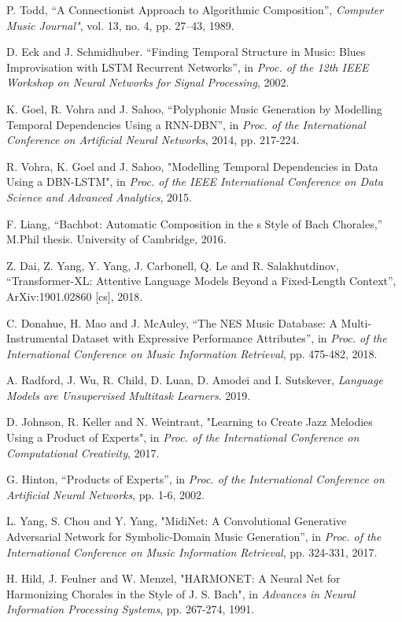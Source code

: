 \documentclass{article}
\begin{document}
\begin{thebibliography}{citations}
P. Todd, “A Connectionist Approach to Algorithmic Composition”, {\em Computer Music Journal"}, vol. 13, no. 4, pp. 27–43, 1989.

D. Eck and J. Schmidhuber. “Finding Temporal Structure in Music: Blues Improvisation with LSTM Recurrent Networks”, in {\em Proc. of the 12th IEEE Workshop on Neural Networks for Signal Processing}, 2002.

K. Goel, R. Vohra and J. Sahoo, “Polyphonic Music Generation by Modelling Temporal Dependencies Using a RNN-DBN”, in {\em Proc. of the International Conference on Artificial Neural Networks}, 2014, pp. 217-224.

R. Vohra, K. Goel and J. Sahoo, "Modelling Temporal Dependencies in Data Using a DBN-LSTM", in {\em Proc. of the IEEE International Conference on Data Science and Advanced Analytics}, 2015.

F. Liang, “Bachbot: Automatic Composition in the s Style of Bach Chorales,” M.Phil thesis. University of Cambridge,  2016.

Z. Dai, Z. Yang, Y. Yang, J. Carbonell, Q. Le and R. Salakhutdinov, “Transformer-XL: Attentive Language Models Beyond a Fixed-Length Context”, ArXiv:1901.02860 [cs], 2018.

C. Donahue, H. Mao and J. McAuley, “The NES Music Database: A Multi-Instrumental Dataset with Expressive Performance Attributes”, in {\em Proc. of the International Conference on Music Information Retrieval}, pp. 475-482, 2018.

A. Radford, J. Wu, R. Child, D. Luan, D. Amodei and I. Sutskever, {\em Language Models are Unsupervised Multitask Learners}. 2019.

D. Johnson, R. Keller and N. Weintraut,  "Learning to Create Jazz Melodies Using a Product of Experts", in {\em Proc. of the International Conference on Computational Creativity}, 2017.

G. Hinton, “Products of Experts”, in {\em Proc. of the International Conference on Artificial Neural Networks}, pp. 1-6, 2002.

L. Yang, S. Chou and Y. Yang, "MidiNet: A Convolutional Generative Adversarial Network for Symbolic-Domain Music Generation”, in {\em Proc. of the International Conference on Music Information Retrieval}, pp. 324-331, 2017.

H. Hild, J. Feulner and W. Menzel, "HARMONET: A Neural Net for Harmonizing Chorales in the Style of J. S. Bach", in {\em Advances in Neural Information Processing Systems}, pp. 267-274, 1991.


\end{thebibliography}
\end{document}
